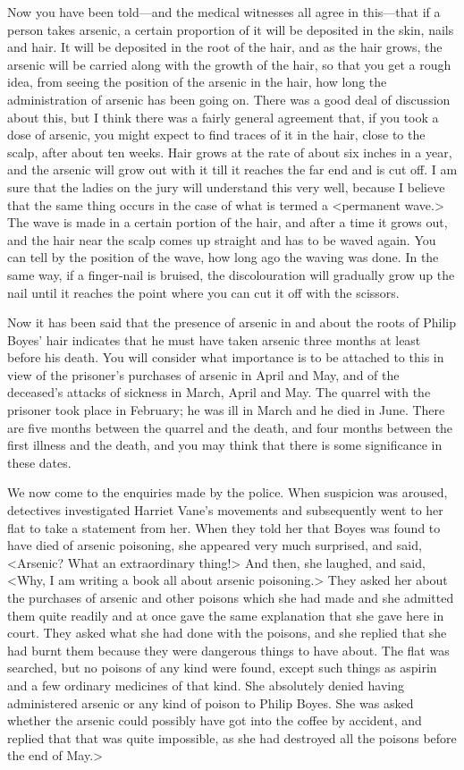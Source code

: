 Now you have been told—and the medical witnesses all agree in this—that if a person takes arsenic, a certain proportion of it will be deposited in the skin, nails and hair. It will be deposited in the root of the hair, and as the hair grows, the arsenic will be carried along with the growth of the hair, so that you get a rough idea, from seeing the position of the arsenic in the hair, how long the administration of arsenic has been going on. There was a good deal of discussion about this, but I think there was a fairly general agreement that, if you took a dose of arsenic, you might expect to find traces of it in the hair, close to the scalp, after about ten weeks. Hair grows at the rate of about six inches in a year, and the arsenic will grow out with it till it reaches the far end and is cut off. I am sure that the ladies on the jury will understand this very well, because I believe that the same thing occurs in the case of what is termed a <permanent wave.> The wave is made in a certain portion of the hair, and after a time it grows out, and the hair near the scalp comes up straight and has to be waved again. You can tell by the position of the wave, how long ago the waving was done. In the same way, if a finger-nail is bruised, the discolouration will gradually grow up the nail until it reaches the point where you can cut it off with the scissors.

Now it has been said that the presence of arsenic in and about the roots of Philip Boyes' hair indicates that he must have taken arsenic three months at least before his death. You will consider what importance is to be attached to this in view of the prisoner's purchases of arsenic in April and May, and of the deceased's attacks of sickness in March, April and May. The quarrel with the prisoner took place in February; he was ill in March and he died in June. There are five months between the quarrel and the death, and four months between the first illness and the death, and you may think that there is some significance in these dates.

We now come to the enquiries made by the police. When suspicion was aroused, detectives investigated Harriet Vane's movements and subsequently went to her flat to take a statement from her. When they told her that Boyes was found to have died of arsenic poisoning, she appeared very much surprised, and said, <Arsenic? What an extraordinary thing!> And then, she laughed, and said, <Why, I am writing a book all about arsenic poisoning.> They asked her about the purchases of arsenic and other poisons which she had made and she admitted them quite readily and at once gave the same explanation that she gave here in court. They asked what she had done with the poisons, and she replied that she had burnt them because they were dangerous things to have about. The flat was searched, but no poisons of any kind were found, except such things as aspirin and a few ordinary medicines of that kind. She absolutely denied having administered arsenic or any kind of poison to Philip Boyes. She was asked whether the arsenic could possibly have got into the coffee by accident, and replied that that was quite impossible, as she had destroyed all the poisons before the end of May.>

